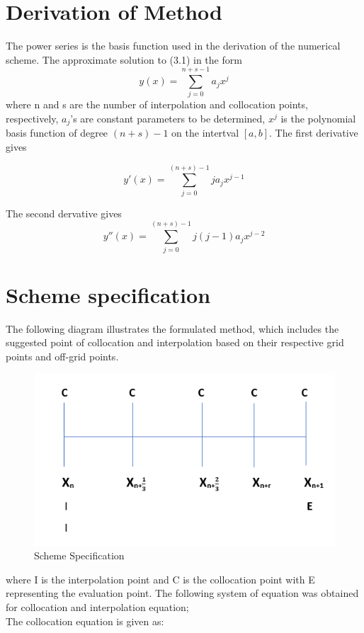 \documentclass[12pt]{report}
\begin{document}
\section{Derivation of Method}
\noindent The power series is the basis function used in the derivation of the numerical scheme. The approximate solution to (3.1) in the form
	\begin{equation}
	y(x) = \sum_{j=0}^{n+s-1}a_{j}x^{j}								
	\end{equation}
	where n and s are the number of interpolation and collocation points, respectively, $a_j$'s are constant parameters to be determined, $x^j$ is the polynomial basis function of degree $(n+s)-1$ on the intertval $[a,b]$. The first derivative gives
	
	\begin{equation}
	y'(x)=\sum_{j=0}^{(n+s)-1} j a_{j}x^{j-1}
	\end{equation}
	
	The second dervative gives
	\begin{equation}
	y''(x)=\sum_{j=0}^{(n+s)-1} j(j-1) a_{j}x^{j-2}
	\end{equation}
	
\section{Scheme specification}
\noindent The following diagram illustrates the formulated method, which includes the suggested point of collocation and interpolation based on their respective grid points and off-grid points.

\begin{figure}[H]
	\centering
	\includegraphics[width=0.7\linewidth]{"proper scheme"}
	\caption{Scheme Specification}
	\label{fig:proper-scheme}
\end{figure}

\noindent where I is the interpolation point and C is the collocation point with E representing the evaluation point.
The following system of equation was obtained for collocation and  interpolation equation;\\
\noindent The collocation equation is given as:
\end{document}
